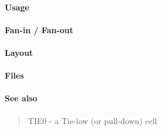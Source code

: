 \paragraph{Usage}

\paragraph{Fan-in / Fan-out}

\paragraph{Layout}

\paragraph{Files}

\paragraph{See also}
\begin{quote}
    TIE0 - a Tie-low (or pull-down) cell
\end{quote}
